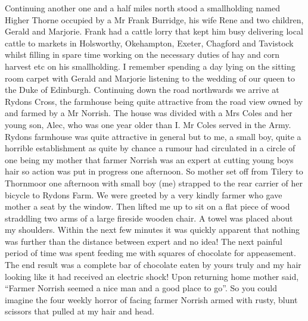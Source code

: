 Continuing another one and a half miles north stood a smallholding named Higher
Thorne occupied by a Mr Frank Burridge, his wife Rene and two children, Gerald
and Marjorie. Frank had a cattle lorry that kept him busy delivering local
cattle to markets in Holsworthy, Okehampton, Exeter, Chagford and Tavistock
whilst filling in spare time working on the necessary duties of hay and corn
harvest etc on his smallholding. I remember spending a day lying on the sitting
room carpet with Gerald and Marjorie listening to the wedding of our queen to
the Duke of Edinburgh. Continuing down the road northwards we arrive at Rydons
Cross, the farmhouse being quite attractive from the road view owned by and
farmed by a Mr Norrish. The house was divided  with a Mrs Coles and her young
son, Alec, who was one year older than I. Mr Coles served in the Army. Rydons
farmhouse was quite attractive in general but to me, a small boy, quite a
horrible establishment as quite by chance a rumour had circulated in a circle
of one being my mother that farmer Norrish was an expert at cutting young boys
hair so action was put in progress one afternoon. So mother set off from Tilery
to Thornmoor one afternoon with small boy (me) strapped to the rear carrier of
her bicycle to Rydons Farm. We were greeted by a very kindly farmer who gave
mother a seat by the window. Then lifted me up to sit on a flat piece of wood
straddling two arms of a large fireside wooden chair. A towel was placed about
my shoulders. Within the next few minutes it was quickly apparent that nothing
was further than the distance between expert and no idea! The next painful
period of time was spent feeding me with squares of chocolate for appeasement.
The end result was a complete bar of chocolate eaten by yours truly and my hair
looking like it had received an electric shock!  Upon returning home mother
said, ``Farmer Norrish seemed a nice man and a good place to go''.  So you
could imagine the four weekly horror of facing farmer Norrish armed with rusty,
blunt scissors that pulled at my hair and head.

